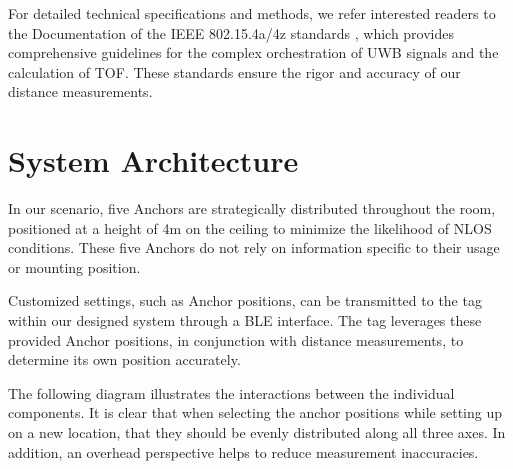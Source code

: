\documentclass[10pt,a4paper,twocolumn]{article}
\begin{document}
For detailed technical specifications and methods,
we refer interested readers to the Documentation of
the IEEE 802.15.4a/4z standards \cite{IEEE802154a} \cite{IEEE802154z},
which provides comprehensive guidelines for the
complex orchestration of \ac{UWB} signals and the calculation of \ac{TOF}.
These standards ensure the rigor and accuracy of our distance measurements.

\section{System Architecture}\label{section:system_arch}
In our scenario, five Anchors are strategically distributed throughout the room,
positioned at a height of 4m on the ceiling to minimize the likelihood of 
\ac{NLOS} conditions.
These five Anchors do not rely on information specific to their usage or mounting position.

Customized settings, such as Anchor positions,
can be transmitted to the tag within our designed system through a \ac{BLE} interface.
The tag leverages these provided Anchor positions,
in conjunction with distance measurements,
to determine its own position accurately.

The following diagram illustrates the interactions between the individual components.
It is clear that when selecting the anchor positions while setting up on a new location,
that they should be evenly distributed along all three axes.
In addition, an overhead perspective helps to reduce measurement inaccuracies.
\end{document}
